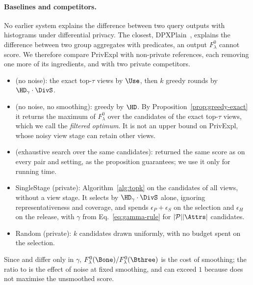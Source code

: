 \paragraph{Baselines and competitors.}
No earlier system explains the difference between two query outputs with histograms under differential privacy.
The closest, DPXPlain~\cite{TaoGMR22}, explains the difference between two group aggregates with predicates, an output $F^0_\lambda$ cannot score.
We therefore compare \textsf{PrivExpl} with non-private references, each removing one more of its ingredients, and with two private competitors.
\begin{itemize}[leftmargin=*,itemsep=1pt,topsep=2pt]
  \item \Bone{} (no noise): the exact top-$\tau$ views by $\Use$, then $k$ greedy rounds by $\HD_\gamma\cdot\DivS$.
  \item \Bthree{} (no noise, no smoothing): greedy by $\HD$. By Proposition~\ref{prop:greedy-exact} it returns the maximum of $F^0_\lambda$ over the candidates of the exact top-$\tau$ views, which we call the \emph{filtered optimum}. It is not an upper bound on \textsf{PrivExpl}, whose noisy view stage can retain other views.
  \item \Btwo{} (exhaustive search over the same candidates): returned the same score as \Bthree{} on every pair and setting, as the proposition guarantees; we use it only for running time.
  \item \textsf{SingleStage} (private): Algorithm~\ref{alg:topk} on the candidates of all views, without a view stage. It selects by $\HD_\gamma\cdot\DivS$ alone, ignoring representativeness and coverage, and spends $\epsilon_P+\epsilon_S$ on the selection and $\epsilon_H$ on the release, with $\gamma$ from Eq.~\eqref{eq:gamma-rule} for $|\mathcal{P}||\Attrs|$ candidates.
  \item \textsf{Random} (private): $k$ candidates drawn uniformly, with no budget spent on the selection.
\end{itemize}
Since \Bone{} and \Bthree{} differ only in $\gamma$, $F^0_\lambda(\Bone)/F^0_\lambda(\Bthree)$ is the cost of smoothing; the ratio to \Bone{} is the effect of noise at fixed smoothing, and can exceed $1$ because \Bone{} does not maximise the unsmoothed score.

